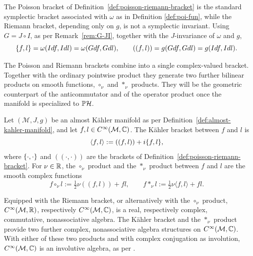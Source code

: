 \begin{remark}
	\label{rem:poisson-riemann-reformulation}
	The Poisson bracket of Definition~\ref{def:poisson-riemann-bracket} is
	the standard symplectic bracket associated with $\omega$ as in Definition \ref{def:poi-fun}, while the Riemann bracket, depending only on $g$, is not a symplectic
	invariant. Using $G=J\circ I$, as per Remark~\ref{rem:G-JI}, together
	with the $J$-invariance of $\omega$ and $g$,
	\begin{equation}
		\{f,l\}=\omega(Idf,Idl)=\omega(Gdf,Gdl),\qquad ((f,l))=g(Gdf,Gdl)=g(Idf,Idl).
	\end{equation}
\end{remark}

\noindent The Poisson and Riemann brackets combine into a single
complex-valued bracket. Together with the ordinary pointwise
product they generate two further bilinear products on smooth
functions, $\circ_\nu$ and $*_{\nu}$ products. They will be the
geometric counterpart of the anticommutator and of the operator
product once the manifold is specialized to $\PH$.

\begin{definition}
	\label{def:kahler-bracket-products}
	Let $(\mathcal{M},J,g)$ be an almost Kähler manifold as per
	Definition~\ref{def:almost-kahler-manifold}, and let $f,l\in
	C^\infty(\mathcal{M},\C)$. The Kähler bracket between $f$ and $l$ is
	\begin{equation}
		\langle f,l\rangle:=((f,l))+i\{f,l\},
	\end{equation}
	where $\{\cdot,\cdot\}$ and $((\cdot,\cdot))$ are the brackets
	of Definition~\ref{def:poisson-riemann-bracket}. For $\nu\in\mathbb{R}$, the
	$\circ_\nu$ product and the $*_{\nu}$ product between $f$ and $l$ are
	the smooth complex functions
	\begin{equation}
		f\circ_\nu l:=\tfrac12\nu((f,l))+fl,\qquad f*_{\nu} l:=\tfrac12\nu\langle f,l\rangle+fl.
	\end{equation}
\end{definition}

\begin{remark}
	\label{rem:algebra-structures}
	Equipped with the Riemann bracket, or alternatively with the
	$\circ_\nu$ product, $C^\infty(\mathcal{M},\R)$, respectively $C^\infty(\mathcal{M},\C)$, is a real, respectively complex, commutative, nonassociative algebra. The Kähler bracket and the $*_{\nu}$ product provide two further complex, nonassociative algebra structures on $C^\infty(\mathcal{M},\C)$. With either of these two products and with complex conjugation as involution, $C^\infty(\mathcal{M},\C)$ is an involutive algebra, as per \cite[p.~2892]{cirelliQuantumMechanicsInfinitedimensional1990}.
\end{remark}

